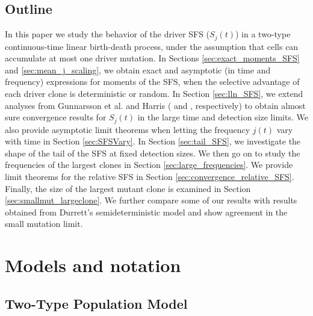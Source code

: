 \documentclass{article}
\numberwithin{equation}{section}
\begin{document}
\subsection{Outline}

In this paper we study the behavior of the driver SFS ($S_j(t)$) in a two-type continuous-time linear birth-death process, under the assumption that cells can accumulate at most one driver mutation. In Sections \ref{sec:exact_moments_SFS} and \ref{sec:mean_j_scaling}, we obtain exact and asymptotic (in time and frequency) expressions for moments of the SFS,  when the selective advantage of each driver clone is deterministic or random. In Section \ref{sec:lln_SFS}, we extend analyses from Gunnarsson et al. and Harris (\cite{gunnarsson2025} and \cite{harris1963}, respectively) to obtain almost sure convergence results for $S_j(t)$ in the large time and detection size limits. We also provide asymptotic limit theorems when letting the frequency $j(t)$ vary with time in Section \ref{sec:SFSVary}.  In Section \ref{sec:tail_SFS}, we investigate the shape of the tail of the SFS at fixed detection sizes. We then go on to study the frequencies of the largest clones in Section \ref{sec:large_frequencies}. We provide limit theorems for the relative SFS in Section \ref{sec:convergence_relative_SFS}. Finally, the size of the largest mutant clone is examined in Section \ref{sec:smallmut_largeclone}. We further compare some of our results with results obtained from Durrett's semideterministic model and show agreement in the small mutation limit.

\section{Models and notation}

\subsection{Two-Type Population Model}
\label{sec:model_notation}
\end{document}
